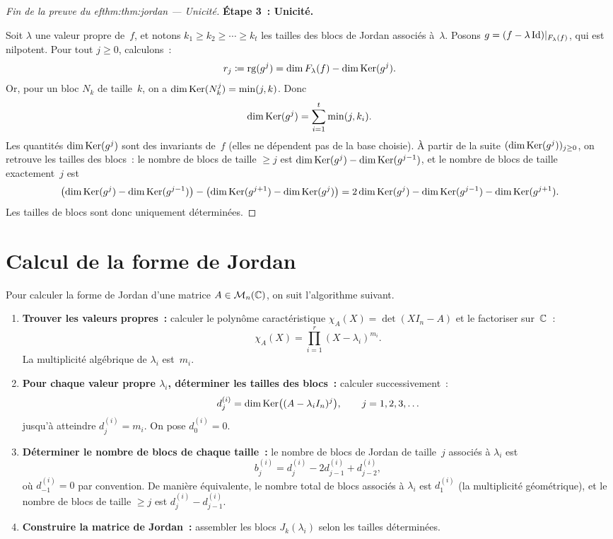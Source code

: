 \begin{proof}[Fin de la preuve du 
ef{thm:thm:jordan} --- Unicité]
  \textbf{Étape 3~: Unicité.}

  Soit $\lambda$ une valeur propre de~$f$, et notons
  $k_1\geq k_2\geq\cdots\geq k_t$ les tailles des blocs de Jordan
  associés à~$\lambda$. Posons $g=(f-\lambda\operatorname{Id})|_{F_\lambda(f)}$, qui
  est nilpotent. Pour tout $j\geq 0$, calculons~:
  \[
    r_j\coloneqq\operatorname{rg}(g^j)=\dim F_\lambda(f)-\dim\operatorname{Ker}(g^j).
  \]
  Or, pour un bloc $N_k$ de taille~$k$, on a
  $\dim\operatorname{Ker}(N_k^j)=\min(j,k)$. Donc
  \[
    \dim\operatorname{Ker}(g^j)=\sum_{i=1}^{t}\min(j,k_i).
  \]
  Les quantités $\dim\operatorname{Ker}(g^j)$ sont des invariants de~$f$
  (elles ne dépendent pas de la base choisie). À partir de la suite
  $(\dim\operatorname{Ker}(g^j))_{j\geq 0}$, on retrouve les tailles des blocs~:
  le nombre de blocs de taille $\geq j$ est
  $\dim\operatorname{Ker}(g^j)-\dim\operatorname{Ker}(g^{j-1})$, et le nombre de blocs de
  taille exactement~$j$ est
  \[
    \bigl(\dim\operatorname{Ker}(g^j)-\dim\operatorname{Ker}(g^{j-1})\bigr)
    -\bigl(\dim\operatorname{Ker}(g^{j+1})-\dim\operatorname{Ker}(g^j)\bigr)
    =2\dim\operatorname{Ker}(g^j)-\dim\operatorname{Ker}(g^{j-1})-\dim\operatorname{Ker}(g^{j+1}).
  \]
  Les tailles de blocs sont donc uniquement déterminées.
\end{proof}


\section{Calcul de la forme de Jordan}\label{sec:calcul-jordan}

Pour calculer la forme de Jordan d'une matrice $A\in\mathcal{M}_n({\mathbb{C}})$, on suit
l'algorithme suivant.

\begin{enumerate}
  \item \textbf{Trouver les valeurs propres~:} calculer le polynôme
    caractéristique $\chi_A(X)=\det(XI_n-A)$ et le factoriser sur~${\mathbb{C}}$~:
    \[
      \chi_A(X)=\prod_{i=1}^{r}(X-\lambda_i)^{m_i}.
    \]
    La multiplicité algébrique de $\lambda_i$ est~$m_i$.

  \item \textbf{Pour chaque valeur propre $\lambda_i$, déterminer les
    tailles des blocs~:} calculer successivement~:
    \[
      d_j^{(i)}=\dim\operatorname{Ker}\bigl((A-\lambda_i I_n)^j\bigr),
      \qquad j=1,2,3,\ldots
    \]
    jusqu'à atteindre $d_j^{(i)}=m_i$. On pose $d_0^{(i)}=0$.

  \item \textbf{Déterminer le nombre de blocs de chaque taille~:}
    le nombre de blocs de Jordan de taille~$j$ associés à $\lambda_i$
    est
    \[
      b_j^{(i)}=d_j^{(i)}-2d_{j-1}^{(i)}+d_{j-2}^{(i)},
    \]
    où $d_{-1}^{(i)}=0$ par convention. De manière équivalente,
    le nombre total de blocs associés à $\lambda_i$ est
    $d_1^{(i)}$ (la multiplicité géométrique), et le nombre de blocs de
    taille $\geq j$ est $d_j^{(i)}-d_{j-1}^{(i)}$.

  \item \textbf{Construire la matrice de Jordan~:} assembler les
    blocs $J_{k}(\lambda_i)$ selon les tailles déterminées.
\end{enumerate}

